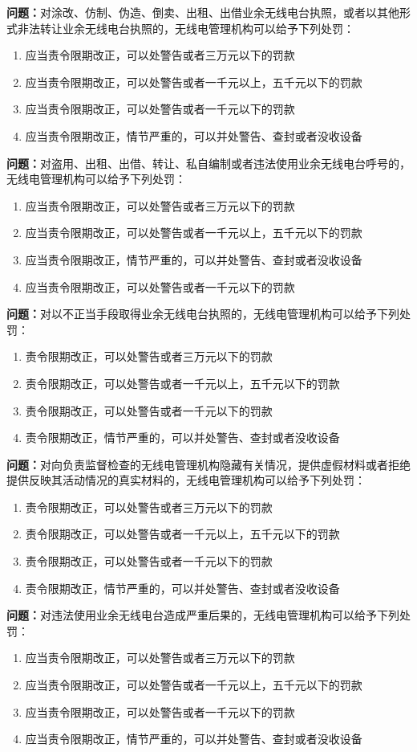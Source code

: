 \textbf{问题：}对涂改、仿制、伪造、倒卖、出租、出借业余无线电台执照，或者以其他形式非法转让业余无线电台执照的，无线电管理机构可以给予下列处罚：
\begin{enumerate}[label=\Alph*), leftmargin=1cm]
  \item 应当责令限期改正，可以处警告或者三万元以下的罚款
  \item 应当责令限期改正，可以处警告或者一千元以上，五千元以下的罚款
  \item 应当责令限期改正，可以处警告或者一千元以下的罚款
  \item 应当责令限期改正，情节严重的，可以并处警告、查封或者没收设备
\end{enumerate}

\textbf{问题：}对盗用、出租、出借、转让、私自编制或者违法使用业余无线电台呼号的，无线电管理机构可以给予下列处罚：
\begin{enumerate}[label=\Alph*), leftmargin=1cm]
  \item 应当责令限期改正，可以处警告或者三万元以下的罚款
  \item 应当责令限期改正，可以处警告或者一千元以上，五千元以下的罚款
  \item 应当责令限期改正，情节严重的，可以并处警告、查封或者没收设备
  \item 应当责令限期改正，可以处警告或者一千元以下的罚款
\end{enumerate}

\textbf{问题：}对以不正当手段取得业余无线电台执照的，无线电管理机构可以给予下列处罚：
\begin{enumerate}[label=\Alph*), leftmargin=1cm]
  \item 责令限期改正，可以处警告或者三万元以下的罚款
  \item 责令限期改正，可以处警告或者一千元以上，五千元以下的罚款
  \item 责令限期改正，可以处警告或者一千元以下的罚款
  \item 责令限期改正，情节严重的，可以并处警告、查封或者没收设备
\end{enumerate}

\textbf{问题：}对向负责监督检查的无线电管理机构隐藏有关情况，提供虚假材料或者拒绝提供反映其活动情况的真实材料的，无线电管理机构可以给予下列处罚：
\begin{enumerate}[label=\Alph*), leftmargin=1cm]
  \item 责令限期改正，可以处警告或者三万元以下的罚款
  \item 责令限期改正，可以处警告或者一千元以上，五千元以下的罚款
  \item 责令限期改正，可以处警告或者一千元以下的罚款
  \item 责令限期改正，情节严重的，可以并处警告、查封或者没收设备
\end{enumerate}

\textbf{问题：}对违法使用业余无线电台造成严重后果的，无线电管理机构可以给予下列处罚：
\begin{enumerate}[label=\Alph*), leftmargin=1cm]
  \item 应当责令限期改正，可以处警告或者三万元以下的罚款
  \item 应当责令限期改正，可以处警告或者一千元以上，五千元以下的罚款
  \item 应当责令限期改正，可以处警告或者一千元以下的罚款
  \item 应当责令限期改正，情节严重的，可以并处警告、查封或者没收设备
\end{enumerate}

